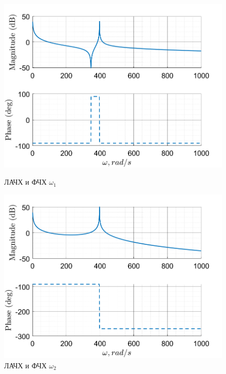 \begin{figure}[!h]
    \centering
    \begin{minipage}{0.5\textwidth}
        \centering
        \includegraphics[width = \textwidth]{img/task1_omega1bode}
        \caption{ЛАЧХ и ФЧХ $\omega_1$}
        \label{fig:img/task1_omega1bode}
    \end{minipage}%
\begin{minipage}{0.5\textwidth}
        \centering
        \includegraphics[width = \textwidth]{img/task1_omega2bode}
        \caption{ЛАЧХ и ФЧХ $\omega_2$}
        \label{fig:img/task1_omega2bode}
    \end{minipage}%
\end{figure}




